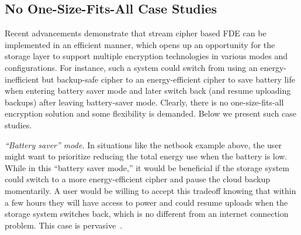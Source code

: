 \subsection{No One-Size-Fits-All Case Studies}

Recent advancements demonstrate that stream cipher based FDE can be implemented
in an efficient manner, which opens up an opportunity for the storage layer to
support multiple encryption technologies in various modes and configurations.
For instance, such a system could switch from using an energy-inefficient but
backup-safe cipher to an energy-efficient cipher to save battery life when
entering battery saver mode and later switch back (and resume uploading backups)
after leaving battery-saver mode. Clearly, there is no one-size-fits-all
encryption solution and some flexibility is demanded. Below we present \numCases
such case studies.


{\em ``Battery saver'' mode.} In situations like the netbook example above, the
user might want to prioritize reducing the total energy use when the battery is
low. While in this ``battery saver mode,'' it would be beneficial if the storage
system could switch to a more energy-efficient cipher and pause the cloud backup
momentarily. A user would be willing to accept this tradeoff knowing that within
a few hours they will have access to power and could resume uploads when the
storage system switches back, which is no different from an internet connection
problem. This case is pervasive~\cite{battery-saver1, battery-saver2,
battery-saver3, battery-saver4, battery-saver5}.

